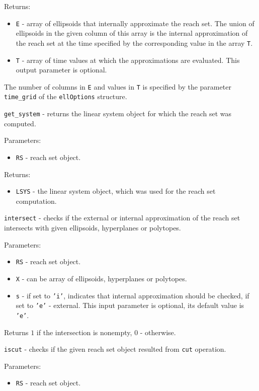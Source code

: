 Returns:
\begin{itemize}
\item {\tt E} - array of ellipsoids that internally approximate the reach set.
The union of ellipsoids in the given column of this array is
the internal approximation of the reach set at the time specified by the
corresponding value in the array {\tt T}.
\item {\tt T} - array of time values at which the approximations
are evaluated. This output parameter is optional.
\end{itemize}
The number of columns in {\tt E} and values in {\tt T} is specified by
the parameter {\tt time\_grid} of the {\tt ellOptions} structure.

\newpage

{\Large {\tt get\_system}} - returns the linear system object for which
the reach set was computed.

Parameters:
\begin{itemize}
\item {\tt RS} - reach set object.
\end{itemize}

Returns:
\begin{itemize}
\item {\tt LSYS} - the linear system object, which was used for the reach
set computation.
\end{itemize}

\newpage

{\Large {\tt intersect}} - checks if the external or internal approximation
of the reach set intersects with given ellipsoids, hyperplanes or
polytopes.

Parameters:
\begin{itemize}
\item {\tt RS} - reach set object.
\item {\tt X} - can be array of ellipsoids, hyperplanes or polytopes.
\item {\tt s} - if set to {\tt 'i'}, indicates that internal approximation
should be checked, if set to {\tt 'e'} - external. This input parameter
is optional, its default value is {\tt 'e'}.
\end{itemize}

Returns $1$ if the intersection is nonempty, $0$ - otherwise.

\newpage

{\Large {\tt iscut}} - checks if the given reach set object resulted
from {\tt cut} operation.

Parameters:
\begin{itemize}
\item {\tt RS} - reach set object.
\end{itemize}

